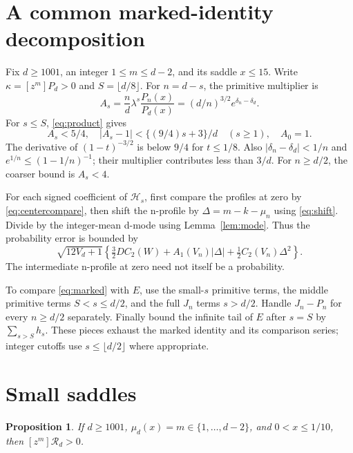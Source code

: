 \documentclass[11pt]{article}
\newtheorem{proposition}[theorem]{Proposition}
\theoremstyle{remark}\newtheorem{remark}[theorem]{Remark}
\newcommand{\Rpoly}{\mathcal R}
\newcommand{\Hcal}{\mathcal H}
\begin{document}
\section{A common marked-identity decomposition}\label{sec:split}
Fix $d\ge1001$, an integer $1\le m\le d-2$, and its saddle $x\le15$.
Write $\kappa=[z^m]P_d>0$ and $S=\lfloor d/8\rfloor$.
For $n=d-s$, the primitive multiplier is
\begin{equation}
 A_s=\frac nd\lambda^s\frac{P_n(x)}{P_d(x)}
     =(d/n)^{3/2}e^{\delta_n-\delta_d}.
\end{equation}
For $s\le S$, \eqref{eq:product} gives
\begin{equation}\label{eq:A}
 A_s<5/4,\quad |A_s-1|<\{(9/4)s+3\}/d\quad(s\ge1),\quad A_0=1.
\end{equation}
The derivative of $(1-t)^{-3/2}$ is below $9/4$ for $t\le1/8$.
Also $|\delta_n-\delta_d|<1/n$ and
$e^{1/n}\le(1-1/n)^{-1}$; their multiplier contributes less than $3/d$.
For $n\ge d/2$, the coarser bound is $A_s<4$.

For each signed coefficient of $\Hcal_s$, first compare the profiles at zero
by \eqref{eq:centercompare}, then shift the n-profile by
$\Delta=m-k-\mu_n$ using \eqref{eq:shift}. Divide by the integer-mean d-mode
using Lemma~\ref{lem:mode}. Thus the probability error is bounded by
\begin{equation}\label{eq:relative}
 \sqrt{12V_d+1}\left\{\tfrac32D C_2(W)
            +A_1(V_n)|\Delta|+\tfrac12C_2(V_n)\Delta^2\right\}.
\end{equation}
The intermediate n-profile at zero need not itself be a probability.

To compare \eqref{eq:marked} with $E$, use the small-$s$ primitive terms,
the middle primitive terms $S<s\le d/2$, and the full $J_n$ terms $s>d/2$.
Handle $J_n-P_n$ for every $n\ge d/2$ separately.
Finally bound the infinite tail of $E$ after $s=S$ by $\sum_{s>S}h_s$.
These pieces exhaust the marked identity and its comparison series;
integer cutoffs use $s\le\lfloor d/2\rfloor$ where appropriate.

\section{Small saddles}\label{sec:small}
\begin{proposition}\label{prop:small}
If $d\ge1001$, $\mu_d(x)=m\in\{1,\ldots,d-2\}$, and $0<x\le1/10$,
then $[z^m]\Rpoly_d>0$.
\end{proposition}
\end{document}
